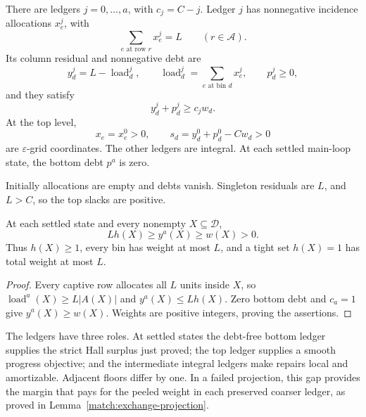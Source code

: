 \begin{definition}
\label{match:invariant}
There are ledgers \(j=0,\ldots,a\), with \(c_j=C-j\).
Ledger \(j\) has nonnegative incidence allocations \(x^j_e\), with
\[
 \sum_{e\text{ at row }r}x^j_e=L\qquad(r\in\mathcal A).
\]
Its column residual and nonnegative debt are
\[
 y^j_d=L-\operatorname{load}^j_d,\qquad
 \operatorname{load}^j_d=\sum_{e\text{ at bin }d}x^j_e,\qquad
 p^j_d\ge0,
\]
and they satisfy
\begin{equation}
                         y^j_d+p^j_d\ge c_jw_d.
 \label{match:ledger-floor}
\end{equation}
At the top level,
\begin{equation}
 x_e=x^0_e>0,\qquad s_d=y^0_d+p^0_d-Cw_d>0
 \label{match:top-slack}
\end{equation}
are \(\varepsilon\)-grid coordinates.  The other ledgers are integral.
At each settled main-loop state, the bottom debt \(p^a\) is zero.
\end{definition}

Initially allocations are empty and debts vanish.  Singleton residuals
are \(L\), and \(L>C\), so the top slacks are positive.

\begin{lemma}
\label{match:bottom-surplus}
At each settled state and every nonempty \(X\subseteq\mathcal D\),
\begin{equation}
                       Lh(X)\ge y^a(X)\ge w(X)>0.
 \label{match:bottom-certificate}
\end{equation}
Thus \(h(X)\ge1\), every bin has weight at most \(L\), and a tight
set \(h(X)=1\) has total weight at most \(L\).
\end{lemma}
\begin{proof}
Every captive row allocates all \(L\) units inside \(X\), so
\(\operatorname{load}^a(X)\ge L|A(X)|\) and \(y^a(X)\le Lh(X)\).
Zero bottom debt and \(c_a=1\) give \(y^a(X)\ge w(X)\).
Weights are positive integers, proving the assertions.
\end{proof}

The ledgers have three roles.  At settled states the debt-free bottom ledger supplies the
strict Hall surplus just proved; the top ledger supplies a smooth progress
objective; and the intermediate integral ledgers make repairs local and
amortizable.  Adjacent floors differ by one.  In a failed projection,
this gap provides the margin that pays for the peeled
weight in each preserved coarser ledger, as proved in
Lemma~\ref{match:exchange-projection}.

